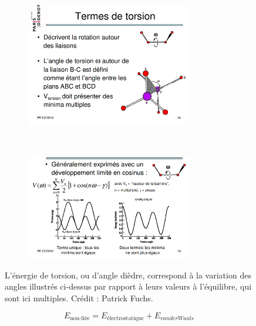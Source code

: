 	\begin{figure}[H]
		\begin{subfigure}{\textwidth}
			\centering
			\includegraphics[width=0.8\textwidth]{./figures/ch1/e_dihedral}
			\label{fig:e_dihedrala}
		\end{subfigure}
		~
		\begin{subfigure}{\textwidth}
			\centering
			\includegraphics[width=0.8\textwidth]{./figures/ch1/e_dihedralb}
			\label{fig:e_dihedralb}
		\end{subfigure}
		\caption[Énergie de torsion, ou d'angles dièdres.]{L'énergie de torsion, ou d'angle dièdre, correspond à la variation des angles illustrés ci-dessus par rapport à leurs valeurs à l'équilibre, qui sont ici multiples. Crédit : Patrick Fuchs.}
		\label{fig:e_dihedral}
	\end{figure}
	
	
	\begin{equation}
		\label{eq:nonbonded}
		E_\text{non-liée} = E_\text{électrostatique} + E_{van der Waals}
	\end{equation}
	
